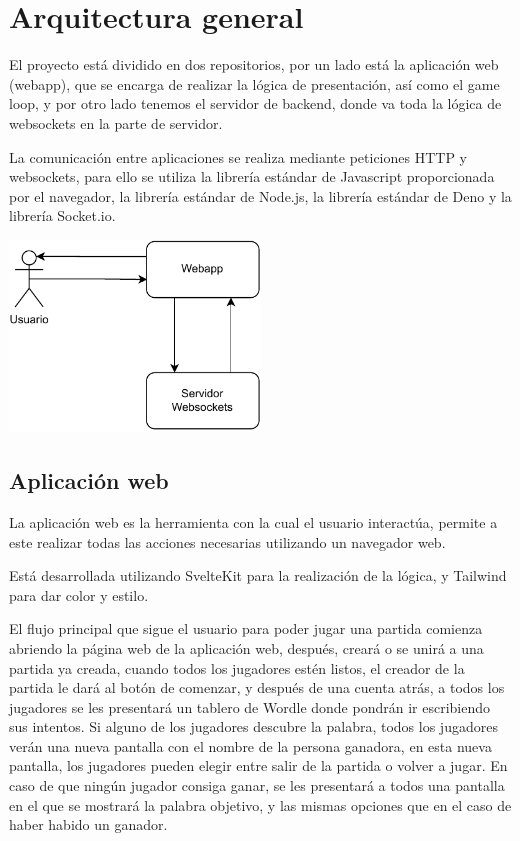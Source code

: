 \section{Arquitectura general}
El proyecto está dividido en dos repositorios, por un lado está la aplicación web (webapp), que se encarga de realizar la lógica de presentación, así como el game loop, y por otro lado tenemos el servidor de backend, donde va toda la lógica de websockets en la parte de servidor.

La comunicación entre aplicaciones se realiza mediante peticiones HTTP y websockets, para ello se utiliza la librería estándar de Javascript proporcionada por el navegador, la librería estándar de Node.js, la librería estándar de Deno y la librería Socket.io.


\begin{center}
	\includegraphics[clip=true,width=0.5\textwidth]{./diagrams/general_arch.pdf}
\end{center}

\subsection{Aplicación web}
La aplicación web es la herramienta con la cual el usuario interactúa, permite a este realizar todas las acciones necesarias utilizando un navegador web.

Está desarrollada utilizando SvelteKit para la realización de la lógica, y Tailwind para dar color y estilo.

El flujo principal que sigue el usuario para poder jugar una partida comienza abriendo la página web de la aplicación web, después, creará o se unirá a una partida ya creada, cuando todos los jugadores estén listos, el creador de la partida le dará al botón de comenzar, y después de una cuenta atrás, a todos los jugadores se les presentará un tablero de Wordle donde pondrán ir escribiendo sus intentos. Si alguno de los jugadores descubre la palabra, todos los jugadores verán una nueva pantalla con el nombre de la persona ganadora, en esta nueva pantalla, los jugadores pueden elegir entre salir de la partida o volver a jugar. En caso de que ningún jugador consiga ganar, se les presentará a todos una pantalla en el que se mostrará la palabra objetivo, y las mismas opciones que en el caso de haber habido un ganador.


